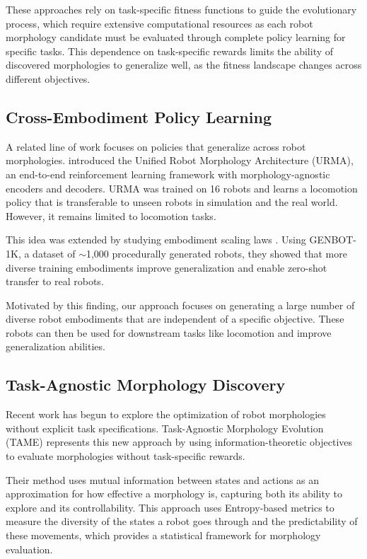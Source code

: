 \documentclass{article}
\theoremstyle{plain}
\theoremstyle{definition}
\theoremstyle{remark}
\begin{document}
These approaches rely on task-specific fitness functions to guide the evolutionary process, which require extensive computational resources as each robot morphology candidate must be evaluated through complete policy learning for specific tasks. This dependence on task-specific rewards limits the ability of discovered morphologies to generalize well, as the fitness landscape changes across different objectives.

\subsection{Cross-Embodiment Policy Learning}

A related line of work focuses on policies that generalize across robot morphologies. \citet{bohlinger2024one} introduced the Unified Robot Morphology Architecture (URMA),
an end-to-end reinforcement learning framework with morphology-agnostic encoders and decoders.
URMA was trained on 16 robots and learns a locomotion policy that is transferable to unseen robots in simulation and the real world. However, it remains limited to locomotion tasks.

This idea was extended by studying embodiment scaling laws \cite{ai2025towards}. Using
GENBOT-1K, a dataset of $\sim$1,000 procedurally generated robots, they showed that more diverse
training embodiments improve generalization and enable zero-shot transfer to real robots.

Motivated by this finding, our approach focuses on generating a large number of diverse robot embodiments that are independent of a specific objective. These robots can then be used for downstream tasks like locomotion and improve generalization abilities.

\subsection{Task-Agnostic Morphology Discovery}

Recent work has begun to explore the optimization of robot morphologies without explicit task specifications. Task-Agnostic Morphology Evolution (TAME) \cite{hejna2021task} represents this new approach by using information-theoretic objectives to evaluate morphologies without task-specific rewards. 

Their method uses mutual information between states and actions as an approximation for how effective a morphology is, capturing both its ability to explore and its controllability. This approach uses Entropy-based metrics to measure the diversity of the states a robot goes through and the predictability of these movements, which provides a statistical framework for morphology evaluation. 
\end{document}
